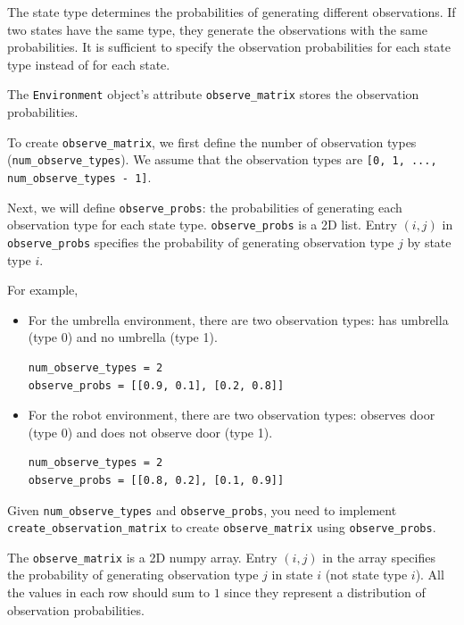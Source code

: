 \documentclass[12pt]{article}
\begin{document}
The state type determines the probabilities of generating different observations. If two states have the same type, they generate the observations with the same probabilities.
It is sufficient to specify the observation probabilities for each state type instead of for each state. 

The \verb+Environment+ object's attribute \verb+observe_matrix+ stores the observation probabilities. 


To create \verb+observe_matrix+, we first define the number of observation types (\verb+num_observe_types+). We assume that the observation types are \verb+[0, 1, ..., num_observe_types - 1]+.

Next, we will define \verb+observe_probs+: the probabilities of generating each observation type for each state type. \verb+observe_probs+ is a 2D list. Entry $(i,j)$ in \verb+observe_probs+ specifies the probability of generating observation type $j$ by state type $i$.

For example, 
\begin{itemize}
\item 
For the umbrella environment, there are two observation types: has umbrella (type 0) and no umbrella (type 1).
%
\begin{verbatim}
num_observe_types = 2
observe_probs = [[0.9, 0.1], [0.2, 0.8]]
\end{verbatim}

\item 
For the robot environment, there are two observation types: observes door (type 0) and does not observe door (type 1).
%
\begin{verbatim}
num_observe_types = 2
observe_probs = [[0.8, 0.2], [0.1, 0.9]]
\end{verbatim}

\end{itemize}

Given \verb+num_observe_types+ and \verb+observe_probs+, you need to implement \\
\verb+create_observation_matrix+ to create \verb+observe_matrix+ using \verb+observe_probs+.

The \verb+observe_matrix+ is a 2D numpy array. Entry $(i,j)$ in the array specifies the probability of generating observation type $j$ in state $i$ (not state type $i$). All the values in each row should sum to $1$ since they represent a distribution of observation probabilities.
\end{document}
